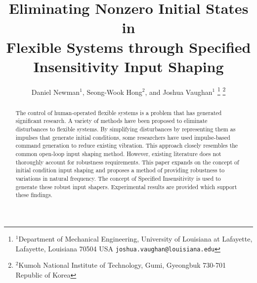 \documentclass[letterpaper,10pt,conference]{ieeeconf}   %
\begin{document}
\title{\LARGE \bf Eliminating Nonzero Initial States in \\Flexible Systems through Specified Insensitivity Input Shaping}

\author{Daniel Newman$^{1}$, Seong-Wook Hong$^{2}$, and Joshua Vaughan$^{1}$%
\thanks{$^{1}$Department of Mechanical Engineering,
        University of Louisiana at Lafayette, Lafayette, Louisiana 70504 USA
        {\tt\small joshua.vaughan@louisiana.edu}}%
\thanks{$^{2}$Kumoh National Institute of Technology,
        Gumi, Gyeongbuk 730-701 Republic of Korea}%
}



    

\maketitle

\begin{abstract}
The control of human-operated flexible systems is a problem that has generated significant research. A variety of methods have been proposed to eliminate disturbances to flexible systems. By simplifying disturbances by representing them as impulses that generate initial conditions, some researchers have used impulse-based command generation to reduce existing vibration. This approach closely resembles the common open-loop input shaping method. However, existing literature does not thoroughly account for robustness requirements. This paper expands on the concept of initial condition input shaping and proposes a method of providing robustness to variations in natural frequency. The concept of Specified Insensitivity is used to generate these robust input shapers. Experimental results are provided which support these findings.
\end{abstract}

\end{document}
